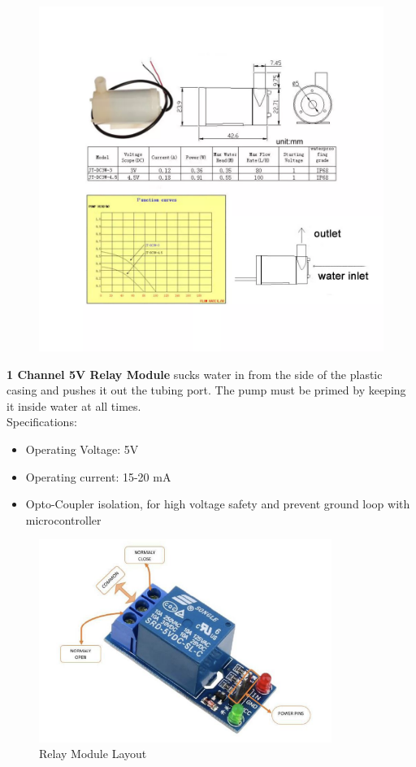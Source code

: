 \documentclass[12pt]{article}
\begin{document}
\newpage

\begin{figure}[ht]
    \centering
    \includegraphics[width=1\textwidth]{images/image4.png}
    \label{fig:pic15}
\end{figure} 

\textbf{1 Channel 5V Relay Module} sucks water in from the side of the plastic casing and pushes it out the tubing port. The pump must be primed by keeping it inside water at all times.\\

\hspace{1cm}Specifications: 
\begin{itemize}[leftmargin=2cm]
    \item Operating Voltage: 5V
    \item Operating current: 15-20 mA
    \item Opto-Coupler isolation, for high voltage safety and prevent ground loop with microcontroller
\end{itemize}

\newpage

\begin{figure}[ht]
    \centering
    \includegraphics[width=0.85\textwidth]{images/image10.png}
    \caption{Relay Module Layout}
    \label{fig:pic16}
\end{figure} 
\end{document}
